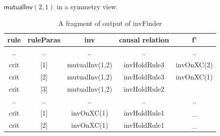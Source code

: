 \documentclass[final]{IEEEtran}
\def \eqc {\doteq }
\def \andc {\barwedge }
\def \negc {!}
\begin{document}
\begin{description}
$\mathsf{mutualInv}(2,1)$ in a symmetry view. %


\end{description}


\vspace{-0.5cm}
 \begin{table}[htbp]
\centering \caption{A fragment of output of {\sf invFinder}\label{table:groundCausalRelation}} %
\begin{tabular}{|c|c|c|c|c|  }
\hline
  rule& ruleParas&inv&causal relation &   f'  \\
\hline
  .. & ..&.. &..&.. \\

\hline
  crit  & [1]&mutualInv(1,2)& invHoldRule3 &invOnXC(2) \\
\hline
  crit &[2]& mutualInv(1,2)& invHoldRule3 &invOnXC(1)  \\
\hline
  crit & [3]& mutualInv(1,2) & invHoldRule2  & \\
\hline
  .. & ..&.. &..&.. \\

\hline
  crit  & [1]&invOnXC(1) & invHoldRule1 &\_ \\
\hline
  crit &[2]& invOnXC(1) & invHoldRule1 &\_  \\
\hline
\end{tabular}
\end{table}
\end{document}
